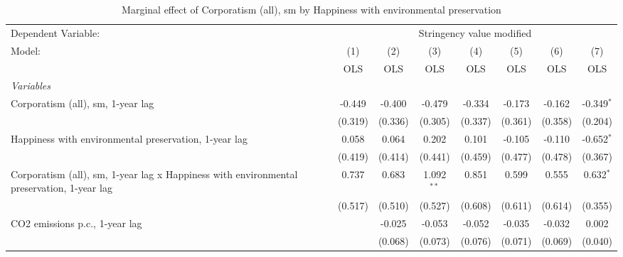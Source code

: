 
\begin{table}[htbp]
   \caption{Marginal effect of Corporatism (all), sm by Happiness with environmental preservation}
   \centering
   \begin{tabular}{lccccccc}
      \toprule
      Dependent Variable: & \multicolumn{7}{c}{Stringency value modified}\\
      Model:                                                                                    & (1)     & (2)     & (3)           & (4)           & (5)           & (6)           & (7)\\  
                                                                                                &  OLS    & OLS     & OLS           & OLS           & OLS           & OLS           & OLS\\  
      \midrule
      \emph{Variables}\\
      Corporatism (all), sm, 1-year lag                                                         & -0.449  & -0.400  & -0.479        & -0.334        & -0.173        & -0.162        & -0.349$^{*}$\\   
                                                                                                & (0.319) & (0.336) & (0.305)       & (0.337)       & (0.361)       & (0.358)       & (0.204)\\   
      Happiness with environmental preservation, 1-year lag                                     & 0.058   & 0.064   & 0.202         & 0.101         & -0.105        & -0.110        & -0.652$^{*}$\\   
                                                                                                & (0.419) & (0.414) & (0.441)       & (0.459)       & (0.477)       & (0.478)       & (0.367)\\   
      Corporatism (all), sm, 1-year lag x Happiness with environmental preservation, 1-year lag & 0.737   & 0.683   & 1.092$^{**}$  & 0.851         & 0.599         & 0.555         & 0.632$^{*}$\\   
                                                                                                & (0.517) & (0.510) & (0.527)       & (0.608)       & (0.611)       & (0.614)       & (0.355)\\   
      CO2 emissions p.c., 1-year lag                                                            &         & -0.025  & -0.053        & -0.052        & -0.035        & -0.032        & 0.002\\   
                                                                                                &         & (0.068) & (0.073)       & (0.076)       & (0.071)       & (0.069)       & (0.040)\\   

\end{tabular}
\end{table}
